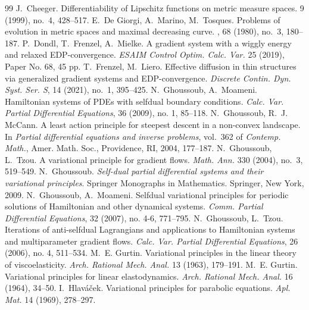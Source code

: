 \documentclass[10pt,a4paper]{amsart}
\begin{document}
\begin{thebibliography}{99}
 J.~Cheeger. \newblock Differentiability of {L}ipschitz functions on metric measure spaces.  9 (1999), no.~4, 428--517.
 E.~De Giorgi, A.~Marino, M.~Tosques. \newblock Problems of evolution in metric spaces and maximal decreasing curve. , 68 (1980), no.~3, 180--187.
 P.~Dondl, T.~Frenzel, A.~Mielke. A gradient system with a wiggly energy and relaxed EDP-convergence. {\it ESAIM Control Optim. Calc. Var.} 25 (2019), Paper No. 68, 45 pp.
 T.~Frenzel, M.~Liero. Effective diffusion in thin structures via generalized gradient systems and EDP-convergence. {\it Discrete Contin. Dyn. Syst. Ser. S}, 14 (2021), no.~1, 395--425.
 N.~Ghoussoub, A.~Moameni. Hamiltonian systems of PDEs with selfdual boundary conditions. {\it Calc. Var. Partial Differential Equations}, 36 (2009), no. 1, 85--118.
 {N.~Ghoussoub, R.~J. McCann}. {A least action principle for steepest descent in a non-convex landscape}. In {\it Partial differential equations and inverse problems}, vol.~362 of {\it Contemp. Math.}, Amer. Math. Soc., Providence, RI, 2004, 177--187.
 {N.~Ghoussoub, L.~Tzou}. {A variational principle for gradient flows}. {\it Math. Ann.} 330 (2004), no.~3, 519--549.
 N.~Ghoussoub. {\it Self-dual partial differential systems and their variational principles}. Springer Monographs in Mathematics. Springer, New York, 2009.
 N.~Ghoussoub, A.~Moameni. Selfdual variational principles for periodic solutions of Hamiltonian and other dynamical systems. {\it Comm. Partial Differential Equations}, 32 (2007), no. 4-6, 771--795.
 N.~Ghoussoub, L.~Tzou. Iterations of anti-selfdual Lagrangians and applications to Hamiltonian systems and multiparameter gradient flows. {\it Calc. Var. Partial Differential Equations}, 26 (2006), no. 4, 511–534.
 {M.~E. Gurtin}. {Variational principles in the linear theory of viscoelasticity}. {\it Arch. Rational Mech. Anal.} 13 (1963), 179--191.
 {M.~E. Gurtin}. {Variational principles for linear elastodynamics}. {\it Arch. Rational Mech. Anal.} 16 (1964), 34--50.
 {I.~Hlav{\'a}{\v{c}}ek}. {Variational principles for parabolic equations}. {\it Apl. Mat.} 14 (1969), 278--297.

\end{thebibliography}
\end{document}
